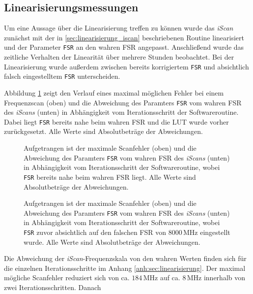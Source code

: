 \subsection{Linearisierungsmessungen}\label{sec:linearisierungsmessungen}
Um eine Aussage über die Linearisierung treffen zu können wurde das
\textit{iScan} zunächst mit der in \ref{sec:linearisierung_iscan} beschriebenen
Routine linearisiert und der Parameter \lstinline|FSR| an den wahren FSR
angepasst. Anschließend wurde das zeitliche Verhalten der Linearität über
mehrere Stunden beobachtet. Bei der Linearisierung wurde außerdem
zwischen bereits korrigiertem \lstinline|FSR| und absichtlich falsch
eingestelltem \lstinline|FSR| unterscheiden.\par
Abbildung \ref{fig:linearisierung_FSR_okay} zeigt den Verlauf eines
maximal möglichen Fehler bei einem Frequenzscan (oben) und die Abweichung des Paramters \lstinline|FSR| vom wahren FSR des
\textit{iScans} (unten) in Abhängigkeit vom Iterationsschritt der
Softwareroutine. Dabei liegt \lstinline|FSR| bereits nahe beim wahren FSR und
die LUT wurde vorher zurückgesetzt. Alle Werte sind Absolutbeträge der
Abweichungen.
\begin{figure}[h]
 	\centering
 	\footnotesize
	
	\caption[Linearisierung \textit{iScan}, FSR okay]{Aufgetrangen ist der
	maximale Scanfehler (oben) und die Abweichung des Paramters
	\lstinline|FSR| vom wahren FSR des \textit{iScans} (unten) in Abhängigkeit vom
	Iterationsschritt der Softwareroutine, wobei \lstinline|FSR| bereits nahe beim
	wahren FSR liegt. Alle Werte sind Absolutbeträge der Abweichungen.}
	\label{fig:linearisierung_FSR_okay}
\end{figure}
\begin{figure}[h]
 	\centering
 	\footnotesize
	
	\caption[Linearisierung \textit{iScan}, FSR korrigiert (1)]{Aufgetrangen ist
	der maximale Scanfehler (oben) und die Abweichung des Paramters
	\lstinline|FSR| vom wahren FSR des \textit{iScans} (unten) in Abhängigkeit vom
	Iterationsschritt der Softwareroutine, wobei \lstinline|FSR| zuvor
	absichtlich auf den falschen FSR von $8000\,$MHz eingestellt wurde. Alle Werte
	sind Absolutbeträge der Abweichungen.}
	\label{fig:linearisierung_FSR_korr_01}
\end{figure}
Die Abweichung der \textit{iScan}-Frequenzskala von den
wahren Werten finden sich für die einzelnen Iterationsschritte im Anhang
\ref{anh:sec:linearisierung}. Der maximal mögliche Scanfehler reduziert sich von
ca. $184\,$MHz auf ca. $8\,$MHz innerhalb von zwei Iterationsschritten. Danach
